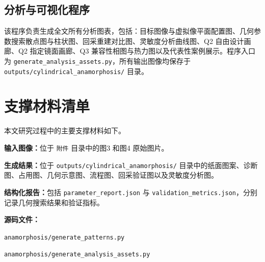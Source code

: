 \documentclass[a4paper,12pt]{ctexart}
\begin{document}
\begin{appendices}
\subsection{分析与可视化程序}
\par 该程序负责生成全文所有分析图表，包括：目标图像与虚拟像平面配置图、几何参数搜索散点图与柱状图、回采重建对比图、灵敏度分析曲线图、Q2 自由设计画廊、Q2 指定镜面画廊、Q3 兼容性相图与热力图以及代表性案例展示。程序入口为 \texttt{generate\_analysis\_assets.py}，所有输出图像均保存于 \texttt{outputs/cylindrical\_anamorphosis/} 目录。

\section{支撑材料清单}
\par 本文研究过程中的主要支撑材料如下。

\par \textbf{输入图像：}位于 \texttt{附件} 目录中的图3 和图4 原始图片。

\par \textbf{生成结果：}位于 \texttt{outputs/cylindrical\_anamorphosis/} 目录中的纸面图案、诊断图、占用图、几何示意图、流程图、回采验证图以及灵敏度分析图。

\par \textbf{结构化报告：}包括 \texttt{parameter\_report.json} 与 \texttt{validation\_metrics.json}，分别记录几何搜索结果和验证指标。

\par \textbf{源码文件：}
\begin{compactitem}
\item \texttt{anamorphosis/generate\_patterns.py}
\item \texttt{anamorphosis/generate\_analysis\_assets.py}
\end{compactitem}

\end{appendices}
\end{document}
